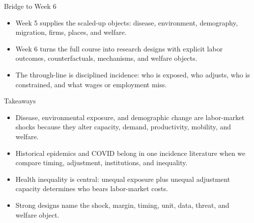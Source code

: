 \documentclass[aspectratio=169,11pt]{beamer}
\begin{document}
\begin{frame}{Bridge to Week 6}
\begin{itemize}
    \item Week 5 supplies the scaled-up objects: disease, environment, demography, migration, firms, places, and welfare.
    \item Week 6 turns the full course into research designs with explicit labor outcomes, counterfactuals, mechanisms, and welfare objects.
    \item The through-line is disciplined incidence: who is exposed, who adjusts, who is constrained, and what wages or employment miss.
\end{itemize}
\end{frame}

\begin{frame}{Takeaways}
\begin{itemize}
    \item Disease, environmental exposure, and demographic change are labor-market shocks because they alter capacity, demand, productivity, mobility, and welfare.
    \item Historical epidemics and COVID belong in one incidence literature when we compare timing, adjustment, institutions, and inequality.
    \item Health inequality is central: unequal exposure plus unequal adjustment capacity determines who bears labor-market costs.
    \item Strong designs name the shock, margin, timing, unit, data, threat, and welfare object.
\end{itemize}
\end{frame}
\end{document}
